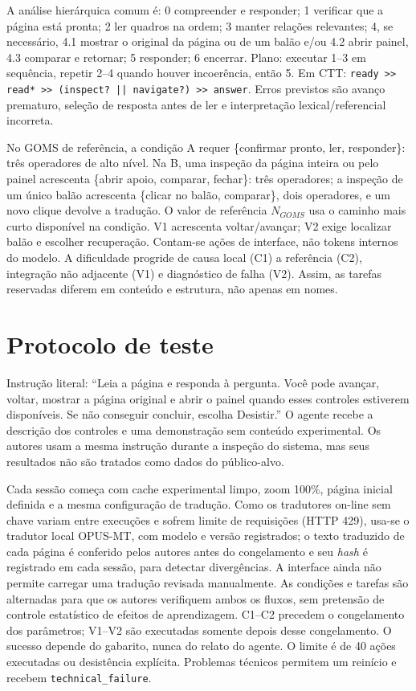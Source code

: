\documentclass[conference]{IEEEtran}
\newcommand{\code}[1]{\texttt{#1}}
\begin{document}
A análise hierárquica comum é: 0 compreender e responder; 1 verificar que a página está pronta; 2 ler quadros na ordem; 3 manter relações relevantes; 4, se necessário, 4.1 mostrar o original da página ou de um balão e/ou 4.2 abrir painel, 4.3 comparar e retornar; 5 responder; 6 encerrar. Plano: executar 1--3 em sequência, repetir 2--4 quando houver incoerência, então 5. Em CTT: \code{ready >> read* >> (inspect? || navigate?) >> answer}. Erros previstos são avanço prematuro, seleção de resposta antes de ler e interpretação lexical/referencial incorreta.

No GOMS de referência, a condição A requer \{confirmar pronto, ler, responder\}: três operadores de alto nível. Na B, uma inspeção da página inteira ou pelo painel acrescenta \{abrir apoio, comparar, fechar\}: três operadores; a inspeção de um único balão acrescenta \{clicar no balão, comparar\}, dois operadores, e um novo clique devolve a tradução. O valor de referência $N_{GOMS}$ usa o caminho mais curto disponível na condição. V1 acrescenta voltar/avançar; V2 exige localizar balão e escolher recuperação. Contam-se ações de interface, não tokens internos do modelo. A dificuldade progride de causa local (C1) a referência (C2), integração não adjacente (V1) e diagnóstico de falha (V2). Assim, as tarefas reservadas diferem em conteúdo e estrutura, não apenas em nomes.

\section{Protocolo de teste}
Instrução literal: ``Leia a página e responda à pergunta. Você pode avançar, voltar, mostrar a página original e abrir o painel quando esses controles estiverem disponíveis. Se não conseguir concluir, escolha Desistir.'' O agente recebe a descrição dos controles e uma demonstração sem conteúdo experimental. Os autores usam a mesma instrução durante a inspeção do sistema, mas seus resultados não são tratados como dados do público-alvo.

Cada sessão começa com cache experimental limpo, zoom 100\%, página inicial definida e a mesma configuração de tradução. Como os tradutores on-line sem chave variam entre execuções e sofrem limite de requisições (HTTP 429), usa-se o tradutor local OPUS-MT, com modelo e versão registrados; o texto traduzido de cada página é conferido pelos autores antes do congelamento e seu \emph{hash} é registrado em cada sessão, para detectar divergências. A interface ainda não permite carregar uma tradução revisada manualmente. As condições e tarefas são alternadas para que os autores verifiquem ambos os fluxos, sem pretensão de controle estatístico de efeitos de aprendizagem. C1--C2 precedem o congelamento dos parâmetros; V1--V2 são executadas somente depois desse congelamento. O sucesso depende do gabarito, nunca do relato do agente. O limite é de 40 ações executadas ou desistência explícita. Problemas técnicos permitem um reinício e recebem \code{technical\_failure}.
\end{document}
